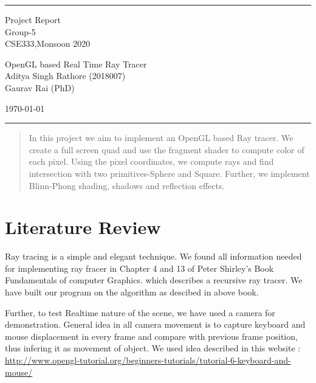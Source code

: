 \documentclass[a4paper]{article}
\begin{document}

\fancyhead[C]{}
\hrule \medskip %
\begin{minipage}{0.295\textwidth} 
\raggedright
\footnotesize
Project Report\hfill\\   
Group-5\hfill\\
CSE333,Monsoon 2020
\end{minipage}
\begin{minipage}{0.4\textwidth} 
\centering 
\large 
OpenGL based Real Time Ray Tracer\\ 
\normalsize 
Aditya Singh Rathore (2018007)\\
Gaurav Rai (PhD) 
\end{minipage}
\begin{minipage}{0.295\textwidth} 
\raggedleft
\today\hfill\\
\end{minipage}
\medskip\hrule 
\bigskip
\begin{abstract}
    In this project we aim to implement an OpenGL based Ray tracer. We create a 
    full screen quad and use the fragment shader to compute color of each pixel.
    Using the pixel coordinates, we compute rays and find intersection with two 
    primitives-Sphere and Square. Further, we implement Blinn-Phong shading, shadows
    and reflection effects. 
\end{abstract}

\section{Literature Review}

Ray tracing is a simple and elegant technique. We found all information needed 
for implementing ray fracer in Chapter 4 and 13 of Peter Shirley's Book 
Fundamentals of computer Graphics.\cite{shirley} which describes a recursive ray
tracer. We have built our program on the algorithm as descibed in above book.

\vspace{\baselineskip} 

Further, to test Realtime nature of the scene, we have used a camera for demonstration.
General idea in all camera movement is to capture keyboard and mouse displacement 
in every frame and compare with previous frame position, thus infering it as movement of 
object. We used idea described in this website : \url{http://www.opengl-tutorial.org/beginners-tutorials/tutorial-6-keyboard-and-mouse/}
\end{document}
